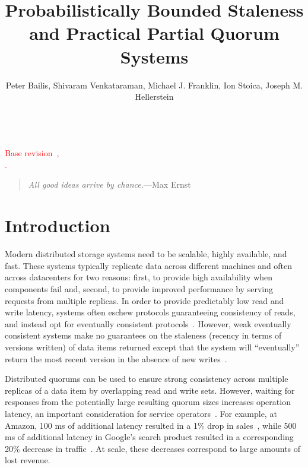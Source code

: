\documentclass{vldb}
\title{Probabilistically Bounded Staleness\\ and Practical Partial Quorum Systems}
\author{Peter Bailis, Shivaram Venkataraman, Michael J. Franklin, Ion Stoica, Joseph M. Hellerstein\\
\affaddr{University of California, Berkeley}\\
\affaddr{\{pbailis, shivaram, franklin, istoica, hellerstein\}@cs.berkeley.edu}}
\newcommand{\sectionskip}{-0em}
\begin{document}

\maketitle


\noindent\textcolor{red}{Base revision~\GITAbrHash,~\GITAuthorDate\\\GITAuthorName.}

\begin{quote}
\textit{All good ideas arrive by chance.}---Max Ernst
\end{quote}



\vspace{\sectionskip}\section{Introduction}

Modern distributed storage systems need to be scalable, highly
available, and fast.  These systems typically replicate data across
different machines and often across datacenters for two reasons:
first, to provide high availability when components fail and, second,
to provide improved performance by serving requests from multiple
replicas.  In order to provide predictably low read and write latency,
systems often eschew protocols guaranteeing consistency of reads, and
instead opt for eventually consistent
protocols~\cite{cassandradefault, abadilatconsist, dynamo, feinbergpc,
  reddit, riaktalkone, outbrain}.  However, weak eventually consistent
systems make no guarantees on the staleness (recency in terms of
versions written) of data items returned except that the system will
``eventually'' return the most recent version in the absence of new
writes~\cite{vogels-defs}.

Distributed quorums can be used to ensure strong consistency across
multiple replicas of a data item by overlapping read and write
sets. However, waiting for responses from the potentially large
resulting quorum sizes increases operation latency, an important
consideration for service operators~\cite{perf-impact}. For example, at Amazon, 100 ms of
additional latency resulted in a 1\% drop in
sales~\cite{amazon-latency}, while 500 ms of additional latency in
Google's search product resulted in a corresponding 20\% decrease in
traffic~\cite{google-talk}.  At scale, these decreases correspond to
large amounts of lost revenue.
\end{document}
